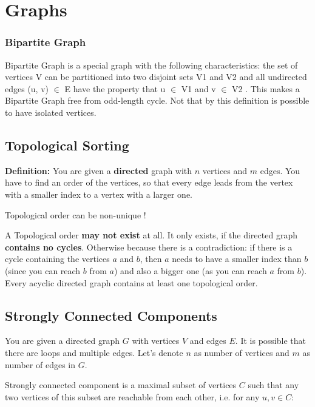 \section{Graphs}





\subsubsection{Bipartite Graph}

Bipartite Graph is a special graph with the following characteristics: the set of vertices V can be partitioned into two disjoint sets V1 and V2 and all undirected edges (u, v) $\in$ E have the property that u $\in$ V1 and v $\in$ V2 . This makes a Bipartite Graph free from odd-length cycle.
Not that by this definition is possible to have isolated vertices.

\subsection{Topological Sorting}

\textbf{Definition:} You are given a \textbf{directed} graph with $n$ vertices and $m$ edges. You have to find an order of the vertices, so that every edge leads from the vertex with a smaller index to a vertex with a larger one.

Topological order can be non-unique !

A Topological order \textbf{may not exist} at all. It only exists, if the directed graph \textbf{contains no cycles}. Otherwise because there is a contradiction: if there is a cycle containing the vertices $a$ and $b$, then $a$ needs to have a smaller index than $b$ (since you can reach $b$ from $a$) and also a bigger one (as you can reach $a$ from $b$). Every acyclic directed graph contains at least one topological order.

\subsection{Strongly Connected Components}

You are given a directed graph $G$ with vertices $V$ and edges $E$. It is possible that there are loops and multiple edges. Let's denote $n$ as number of vertices and $m$ as number of edges in $G$.

Strongly connected component is a maximal subset of vertices
$C$ such that any two vertices of this subset are reachable from each other, i.e. for any $u, v \in C$:

